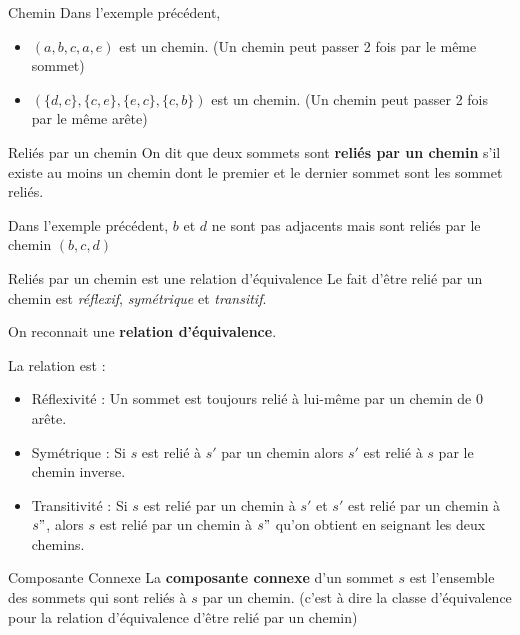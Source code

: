 \begin{Example}{Chemin}{}
Dans l'exemple précédent,
\begin{itemize}
    \item $(a,b,c,a,e)$ est un chemin. (Un chemin peut passer 2 fois par le même sommet)
    \item $(\{d,c\},\{c,e\}, \{e, c\}, \{c,b\})$ est un chemin. (Un chemin peut passer 2 fois par le même arête)
\end{itemize}
\end{Example}

\begin{Definition}[colbacktitle=red!75!black]{Reliés par un chemin}{}
On dit que deux sommets sont \textbf{reliés par un chemin} s'il existe au moins un chemin dont le premier et le dernier sommet sont les sommet reliés.
\end{Definition}

\begin{Example}{}{}
Dans l'exemple précédent, $b$ et $d$ ne sont pas adjacents mais sont reliés par le chemin $(b,c,d)$
\end{Example}

\begin{Prop}{Reliés par un chemin est une relation d'équivalence}{}
Le fait d'être relié par un chemin est \textit{réflexif}, \textit{symétrique} et \textit{transitif}.

On reconnait une \textbf{relation d'équivalence}.
\end{Prop}

\begin{myproof}
La relation est :
\begin{itemize}
    \item Réflexivité : Un sommet est toujours relié à lui-même par un chemin de 0 arête.
    \item Symétrique : Si $s$ est relié à $s'$ par un chemin alors $s'$ est relié à $s$ par le chemin inverse.
    \item Transitivité : Si $s$ est relié par un chemin à $s'$ et $s'$ est relié par un chemin à $s"$, alors  $s$ est relié par un chemin à $s"$ qu'on obtient en seignant les deux chemins.
\end{itemize}
\end{myproof}

\begin{Definition}[colbacktitle=red!75!black]{Composante Connexe}{}
La \textbf{composante connexe} d'un sommet $s$ est l'ensemble des sommets qui sont reliés à $s$ par un chemin. (c'est à dire la classe d'équivalence pour la relation d'équivalence d'être relié par un chemin)



\end{Definition}


